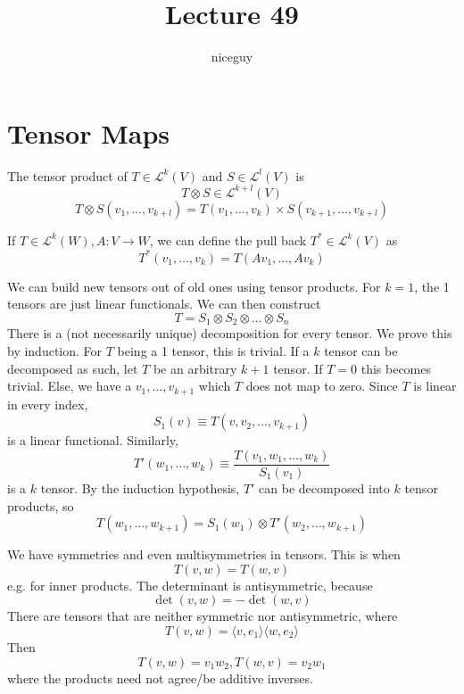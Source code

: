 \documentclass[12pt]{article}
\title{Lecture 49}
\author{niceguy}
\begin{document}
\maketitle

\section{Tensor Maps}

\begin{defn}
    The tensor product of $T \in \mathcal L^k(V)$ and $S \in \mathcal L^l(V)$ is
    $$T \otimes S \in \mathcal L^{k+l}(V)$$
    $$T \otimes S (v_1,\dots,v_{k+l}) = T(v_1,\dots,v_k) \times S(v_{k+1},\dots,v_{k+l})$$
\end{defn}

\begin{defn}
    If $T \in \mathcal L^k(W), A: V \rightarrow W$, we can define the pull back $T^* \in \mathcal L^k(V)$ as
    $$T^*(v_1,\dots,v_k) = T(Av_1, \dots, Av_k)$$
\end{defn}

We can build new tensors out of old ones using tensor products. For $k = 1$, the 1 tensors are just linear functionals. We can then construct
$$T = S_1 \otimes S_2 \otimes \dots \otimes S_n$$
There is a (not necessarily unique) decomposition for every tensor. We prove this by induction. For $T$ being a 1 tensor, this is trivial. If a $k$ tensor can be decomposed as such, let $T$ be an arbitrary $k+1$ tensor. If $T = 0$ this becomes trivial. Else, we have a $v_1,\dots,v_{k+1}$ which $T$ does not map to zero. Since $T$ is linear in every index,
$$S_1(v) \equiv T(v, v_2,\dots,v_{k+1})$$
is a linear functional. Similarly,
$$T'(w_1,\dots,w_k) \equiv \frac{T(v_1,w_1,\dots,w_k)}{S_1(v_1)}$$
is a $k$ tensor. By the induction hypothesis, $T'$ can be decomposed into $k$ tensor products, so
$$T(w_1,\dots,w_{k+1}) = S_1(w_1) \otimes T'(w_2,\dots,w_{k+1})$$

We have symmetries and even multisymmetries in tensors. This is when
$$T(v,w) = T(w,v)$$
e.g. for inner products. The determinant is antisymmetric, because
$$\det(v,w) = -\det(w,v)$$
There are tensors that are neither symmetric nor antisymmetric, where
$$T(v,w) = \langle v,e_1 \rangle \langle w,e_2 \rangle$$
Then
$$T(v,w) = v_1w_2, T(w,v) = v_2w_1$$
where the products need not agree/be additive inverses.
\end{document}
